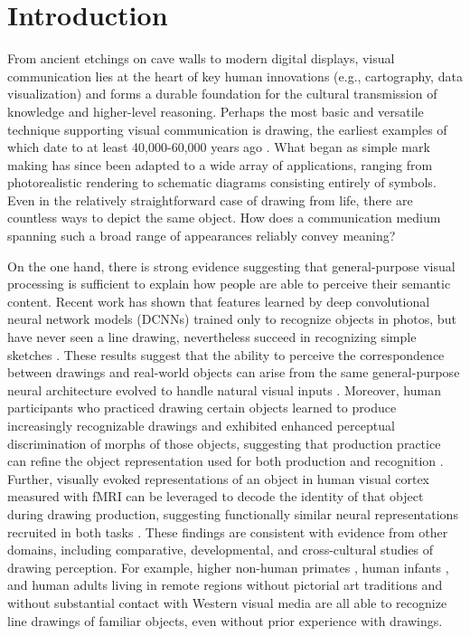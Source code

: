 \documentclass[11pt,letterpaper]{article}
\begin{document}
\section{Introduction}

From ancient etchings on cave walls to modern digital displays, visual communication lies at the heart of key human innovations (e.g., cartography, data visualization) and forms a durable foundation for the cultural transmission of knowledge and higher-level reasoning.
Perhaps the most basic and versatile technique supporting visual communication is drawing, the earliest examples of which date to at least 40,000-60,000 years ago \cite{hoffmann2018u}.
What began as simple mark making has since been adapted to a wide array of applications, ranging from photorealistic rendering to schematic diagrams consisting entirely of symbols.
Even in the relatively straightforward case of drawing from life, there are countless ways to depict the same object.
How does a communication medium spanning such a broad range of appearances reliably convey meaning?

On the one hand, there is strong evidence suggesting that general-purpose visual processing is sufficient to explain how people are able to perceive their semantic content.
Recent work has shown that features learned by deep convolutional neural network models (DCNNs) trained only to recognize objects in photos, but have never seen a line drawing, nevertheless succeed in recognizing simple sketches \cite{fan2018common}. 
These results suggest that the ability to perceive the correspondence between drawings and real-world objects can arise from the same general-purpose neural architecture evolved to handle natural visual inputs \cite{Sayim:2011bz,gibson1979ecological}.
Moreover, human participants who practiced drawing certain objects learned to produce increasingly recognizable drawings and exhibited enhanced perceptual discrimination of morphs of those objects, suggesting that production practice can refine the object representation used for both production and recognition \cite{fan2018common}.
Further, visually evoked representations of an object in human visual cortex measured with fMRI can be leveraged to decode the identity of that object during drawing production, suggesting functionally similar neural representations recruited in both tasks \cite{fan2020relating}.
These findings are consistent with evidence from other domains, including comparative, developmental, and cross-cultural studies of drawing perception.
For example, higher non-human primates \cite{tanaka2007recognition}, human infants \cite{hochberg1962pictorial}, and human adults living in remote regions without pictorial art traditions and without substantial contact with Western visual media \cite{kennedy1975outline} are all able to recognize line drawings of familiar objects, even without prior experience with drawings.
\end{document}
